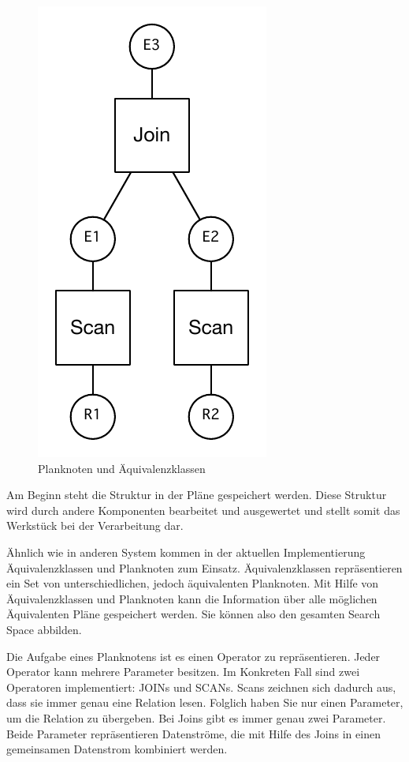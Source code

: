 \begin{figure}[h]
  \centering
  \includegraphics{04_Implementierung/JoinScan.pdf}
  \caption{Planknoten und Äquivalenzklassen}
  \label{PlanAequi}
\end{figure}

Am Beginn steht die Struktur in der Pläne gespeichert werden. Diese Struktur wird durch andere Komponenten bearbeitet und ausgewertet und stellt somit das Werkstück bei der Verarbeitung dar.

Ähnlich wie in anderen System kommen in der aktuellen Implementierung Äquivalenzklassen und Planknoten zum Einsatz. Äquivalenzklassen repräsentieren ein Set von unterschiedlichen, jedoch äquivalenten Planknoten. Mit Hilfe von Äquivalenzklassen und Planknoten kann die Information über alle möglichen Äquivalenten Pläne gespeichert werden. Sie können also den gesamten Search Space abbilden.

Die Aufgabe eines Planknotens ist es einen Operator zu repräsentieren. Jeder Operator kann mehrere Parameter besitzen. Im Konkreten Fall sind zwei Operatoren implementiert: JOINs und SCANs. Scans zeichnen sich dadurch aus, dass sie immer genau eine Relation lesen. Folglich haben Sie nur einen Parameter, um die Relation zu übergeben. Bei Joins gibt es immer genau zwei Parameter. Beide Parameter repräsentieren Datenströme, die mit Hilfe des Joins in einen gemeinsamen Datenstrom kombiniert werden.

